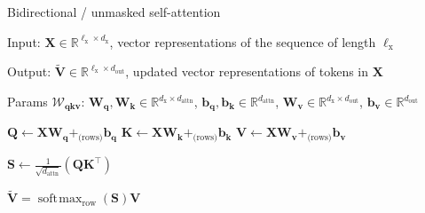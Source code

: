 \documentclass[12pt,aspectratio=169,handout]{beamer}
\DeclareMathOperator*{\softmax}{soft\!\max}
\begin{document}
\begin{frame}{Bidirectional / unmasked self-attention}
	
	\begin{minipage}[t][10cm][t]{15cm}
		
		Input: $\bm{X} \in \mathbb{R}^{\ell_{\text{x}} \times d_{\text{x}}}$, vector representations of the sequence of length $\ell_{\text{x}}$
		
		Output: $\bm{\tilde{V}} \in \mathbb{R}^{\ell_{\text{x}} \times d_{\text{out}}}$, updated vector representations of tokens in $\bm{X}$
		
		Params $\bm{\mathcal{W}_{qkv}}$: $\bm{W_q}, \bm{W_k} \in \mathbb{R}^{d_\text{x} \times d_\text{attn}}$, $\bm{b_q}, \bm{b_k} \in \mathbb{R}^{d_\text{attn}}$, $\bm{W_v} \in \mathbb{R}^{d_\text{x} \times d_\text{out}}$, $ \bm{b_v} \in \mathbb{R}^{d_\text{out}}$
		
		\begin{algorithmic}[1]
			\State $\bm{Q} \gets \bm{X} \bm{W_q} +_{\text{(rows)}} \bm{b_q}$
			\State $\bm{K} \gets \bm{X} \bm{W_k} +_{\text{(rows)}} \bm{b_k}$
			\State $\bm{V} \gets \bm{X} \bm{W_v} +_{\text{(rows)}} \bm{b_v}$
			
			\State $\bm{S} \gets \frac{1}{\sqrt{d_{\text{attn}}}} (\bm{Q} \bm{K}^\top)$
			
			\State \Return $\bm{\tilde V} = \softmax_{\text{row}}(\bm{S}) \bm{V}$
			
			\EndFunction
		\end{algorithmic}
		
	\end{minipage}
\end{frame}
\end{document}
